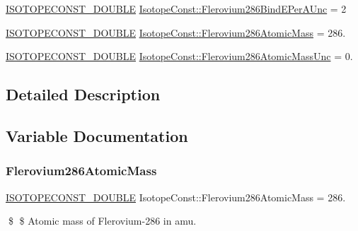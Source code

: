 \begin{DoxyCompactItemize}
\mbox{\hyperlink{group___isotope_const-_macros_ga8f45a7272ce02c0b4c65c44636ed719a}{I\+S\+O\+T\+O\+P\+E\+C\+O\+N\+S\+T\+\_\+\+D\+O\+U\+B\+LE}} \mbox{\hyperlink{group___isotope_const-_flerovium-_fl286_ga3fb29034412c2370f4706e179c1337b2}{Isotope\+Const\+::\+Flerovium286\+Bind\+E\+Per\+A\+Unc}} = 2
\item 
\mbox{\hyperlink{group___isotope_const-_macros_ga8f45a7272ce02c0b4c65c44636ed719a}{I\+S\+O\+T\+O\+P\+E\+C\+O\+N\+S\+T\+\_\+\+D\+O\+U\+B\+LE}} \mbox{\hyperlink{group___isotope_const-_flerovium-_fl286_ga783f0891c31870b42757e9a654be914b}{Isotope\+Const\+::\+Flerovium286\+Atomic\+Mass}} = 286.
\item 
\mbox{\hyperlink{group___isotope_const-_macros_ga8f45a7272ce02c0b4c65c44636ed719a}{I\+S\+O\+T\+O\+P\+E\+C\+O\+N\+S\+T\+\_\+\+D\+O\+U\+B\+LE}} \mbox{\hyperlink{group___isotope_const-_flerovium-_fl286_gab6e27b40256d175ffe8c734ed5217cf0}{Isotope\+Const\+::\+Flerovium286\+Atomic\+Mass\+Unc}} = 0.
\end{DoxyCompactItemize}


\subsection{Detailed Description}


\subsection{Variable Documentation}
\mbox{\label{group___isotope_const-_flerovium-_fl286_ga783f0891c31870b42757e9a654be914b}} 
\subsubsection{\texorpdfstring{Flerovium286\+Atomic\+Mass}{Flerovium286AtomicMass}}
{\footnotesize\ttfamily \mbox{\hyperlink{group___isotope_const-_macros_ga8f45a7272ce02c0b4c65c44636ed719a}{I\+S\+O\+T\+O\+P\+E\+C\+O\+N\+S\+T\+\_\+\+D\+O\+U\+B\+LE}} Isotope\+Const\+::\+Flerovium286\+Atomic\+Mass = 286.}

\$ \$ Atomic mass of Flerovium-\/286 in amu. \mbox{\label{group___isotope_const-_flerovium-_fl286_gab6e27b40256d175ffe8c734ed5217cf0}} 
